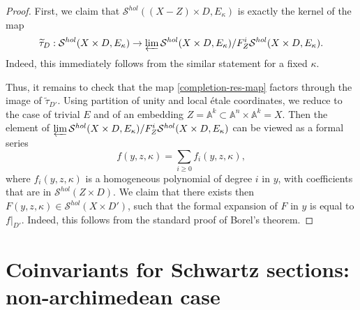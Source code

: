 \documentclass[12pt,reqno]{amsart}
\DeclareMathOperator\C{\mathbb C}
\newtheorem{prop}[theorem]{Proposition}
\theoremstyle{definition}
\theoremstyle{remark}
\numberwithin{equation}{section}
\newcommand{\A}{{\mathbb A}}
\newcommand{\wt}{\widetilde}
\newcommand{\ot}{\otimes}
\renewcommand{\SS}{{\mathcal S}}
\newcommand{\sub}{\subset}
\begin{document}
\begin{proof} 
First, we claim that $\SS^{hol}((X-Z)\times D,E_{\kappa})$ is exactly the kernel of the map
$$\wt{\tau}_D:\SS^{hol}(X\times D,E_{\kappa})\to \varprojlim \SS^{hol}(X\times D,E_{\kappa})/F_Z^i\SS^{hol}(X\times D,E_{\kappa}).$$
Indeed, this immediately follows from the similar statement for a fixed $\kappa$.

Thus, it remains to check that the map \eqref{completion-res-map} factors through the image of $\wt{\tau}_{D'}$.
Using partition of unity and local \'etale coordinates, we reduce to the case of trivial $E$ and of an embedding $Z=\A^k\sub \A^n\times \A^k=X$.
Then the element of $\varprojlim \SS^{hol}(X\times D,E_{\kappa})/F_Z^i\SS^{hol}(X\times D,E_{\kappa})$
can be viewed as a formal series 
$$f(y,z,\kappa)=\sum_{i\ge 0}f_i(y,z,\kappa),$$
where $f_i(y,z,\kappa)$ is a homogeneous polynomial of degree $i$ in $y$, with coefficients that are in $\SS^{hol}(Z\times D)$.
We claim that there exists then $F(y,z,\kappa)\in \SS^{hol}(X\times D')$,
such that the formal expansion of $F$ in $y$ is equal to $f|_{D'}$.
Indeed, this follows from the standard proof of Borel's theorem. 
\end{proof}



\section{Coinvariants for Schwartz sections: non-archimedean case}\label{coinv-nonarch-sec}
\end{document}
